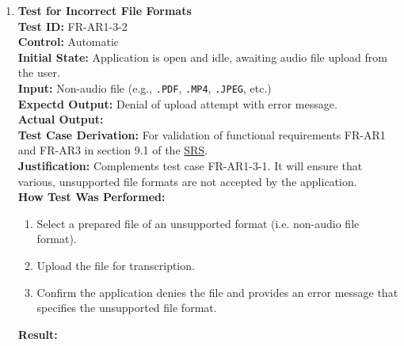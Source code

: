\documentclass[12pt, titlepage]{article}
\begin{document}
\begin{enumerate}
  \item \textbf{Test for Incorrect File Formats} \\
    \newline
    \textbf{Test ID:} FR-AR1-3-2 \\
    \textbf{Control:} Automatic \\
    \textbf{Initial State:} Application is open and idle, awaiting audio file upload from the user. \\
    \textbf{Input:} Non-audio file (e.g., \texttt{.PDF}, \texttt{.MP4}, \texttt{.JPEG}, etc.) \\
    \textbf{Expectd Output:} Denial of upload attempt with error message. \\
    \textbf{Actual Output:} \\
    \textbf{Test Case Derivation:} For validation of functional requirements FR-AR1 and FR-AR3 in section 9.1 of the
    \href{https://github.com/emilyperica/ScoreGen/blob/main/docs/SRS-Volere/SRS.pdf}{SRS}. \\
    \textbf{Justification:} Complements test case FR-AR1-3-1. It will ensure that various, unsupported file formats are 
    not accepted by the application. \\
    \textbf{How Test Was Performed:}
    \begin{enumerate}
        \item Select a prepared file of an unsupported format (i.e. non-audio file format).
        \item Upload the file for transcription.
        \item Confirm the application denies the file and provides an error message that specifies the unsupported file format.
    \end{enumerate}
    \textbf{Result:}
  

\end{enumerate}
\end{document}

